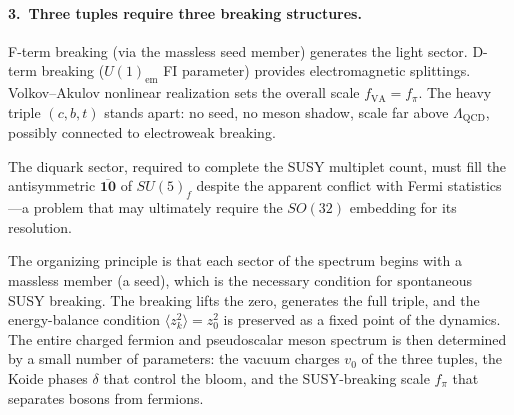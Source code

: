 \documentclass[12pt,a4paper]{article}
\begin{document}
\paragraph{3.\ Three tuples require three breaking structures.}
F-term breaking (via the massless seed member) generates the light 
sector. D-term breaking ($U(1)_{\text{em}}$ FI parameter) provides 
electromagnetic splittings. Volkov--Akulov nonlinear realization 
sets the overall scale $f_{\text{VA}} = f_\pi$. The heavy triple 
$(c,b,t)$ stands apart: no seed, no meson shadow, scale far above 
$\Lambda_{\text{QCD}}$, possibly connected to electroweak breaking.

The diquark sector, required to complete the SUSY multiplet count, 
must fill the antisymmetric $\overline{\mathbf{10}}$ of $SU(5)_f$ 
despite the apparent conflict with Fermi statistics---a problem 
that may ultimately require the $SO(32)$ embedding for its 
resolution.

The organizing principle is that each sector of the spectrum begins 
with a massless member (a seed), which is the necessary condition 
for spontaneous SUSY breaking. The breaking lifts the zero, 
generates the full triple, and the energy-balance condition 
$\langle z_k^2\rangle = z_0^2$ is preserved as a fixed point 
of the dynamics. The entire charged fermion and pseudoscalar meson 
spectrum is then determined by a small number of parameters: the 
vacuum charges $v_0$ of the three tuples, the Koide phases 
$\delta$ that control the bloom, and the SUSY-breaking scale 
$f_\pi$ that separates bosons from fermions.
\end{document}
